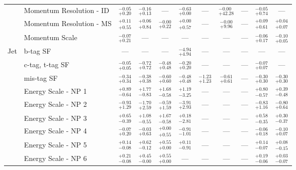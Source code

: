 \begin{tabular}{|cl||ccccccc|c||c|}
\cline{2-11}
&Momentum Resolution - ID &  $^{-0.05}_{+0.20}$  &  $^{-0.16}_{+0.13}$  & --- &  $^{-0.63}_{+0.00}$  & --- &  $^{-0.00}_{+42.28}$  & --- &  $^{-0.05}_{+0.74}$  & ---\\ 
\cline{2-11}
&Momentum Resolution - MS &  $^{+0.11}_{+0.55}$  &  $^{+0.06}_{+0.84}$  &  $^{-0.00}_{+0.22}$  &  $^{+0.00}_{+0.57}$  & --- &  $^{-0.00}_{+9.96}$  & --- &  $^{+0.09}_{+0.61}$  &  $^{+0.04}_{+0.07}$ \\ 
\cline{2-11}
&Momentum Scale &  $^{-0.07}_{+0.21}$  & --- & --- & --- & --- & --- & --- &  $^{-0.06}_{+0.17}$  &  $^{-0.10}_{+0.05}$ \\ 
\hline
\multirow{22}{*}{Jet}
&b-tag SF & --- & --- & --- &  $^{-4.94}_{+4.94}$  & --- & --- & --- & --- & ---\\ 
\cline{2-11}
&c-tag, t-tag SF &  $^{-0.05}_{+0.05}$  &  $^{-0.72}_{+0.72}$  &  $^{-0.48}_{+0.48}$  &  $^{-0.20}_{+0.20}$  & --- & --- & --- &  $^{-0.07}_{+0.07}$  & ---\\ 
\cline{2-11}
&mis-tag SF &  $^{-0.34}_{+0.34}$  &  $^{-0.38}_{+0.38}$  &  $^{-0.60}_{+0.60}$  &  $^{-0.48}_{+0.48}$  &  $^{-1.23}_{+1.23}$  &  $^{-0.61}_{+0.61}$  & --- &  $^{-0.30}_{+0.30}$  &  $^{-0.30}_{+0.30}$ \\ 
\cline{2-11}
&Energy Scale - NP 1 &  $^{+0.89}_{-0.64}$  &  $^{+1.77}_{-0.83}$  &  $^{+1.68}_{-0.58}$  &  $^{+1.19}_{-3.25}$  & --- & --- & --- &  $^{+0.80}_{-0.57}$  &  $^{+0.39}_{-0.48}$ \\ 
\cline{2-11}
&Energy Scale - NP 2 &  $^{-0.93}_{+1.29}$  &  $^{-1.70}_{+2.59}$  &  $^{-0.59}_{+1.59}$  &  $^{-3.91}_{+2.93}$  & --- & --- & --- &  $^{-0.83}_{+1.16}$  &  $^{-0.80}_{+0.64}$ \\ 
\cline{2-11}
&Energy Scale - NP 3 &  $^{+0.65}_{-0.39}$  &  $^{+1.08}_{-0.55}$  &  $^{+1.67}_{-0.58}$  &  $^{+0.18}_{-2.81}$  & --- & --- & --- &  $^{+0.58}_{-0.35}$  &  $^{+0.30}_{-0.37}$ \\ 
\cline{2-11}
&Energy Scale - NP 4 &  $^{-0.07}_{+0.20}$  &  $^{-0.03}_{+0.63}$  &  $^{+0.00}_{+0.55}$  &  $^{-0.91}_{-1.01}$  & --- & --- & --- &  $^{-0.06}_{+0.18}$  &  $^{-0.10}_{+0.07}$ \\ 
\cline{2-11}
&Energy Scale - NP 5 &  $^{+0.14}_{-0.08}$  &  $^{+0.62}_{-0.12}$  &  $^{+0.55}_{+0.00}$  &  $^{+0.11}_{-0.91}$  & --- & --- & --- &  $^{+0.14}_{-0.07}$  &  $^{+0.08}_{-0.15}$ \\ 
\cline{2-11}
&Energy Scale - NP 6 &  $^{+0.21}_{-0.08}$  &  $^{+0.45}_{-0.00}$  &  $^{+0.55}_{+0.00}$  & --- & --- & --- & --- &  $^{+0.19}_{-0.06}$  &  $^{+0.03}_{-0.07}$ \\ 

\end{tabular}
